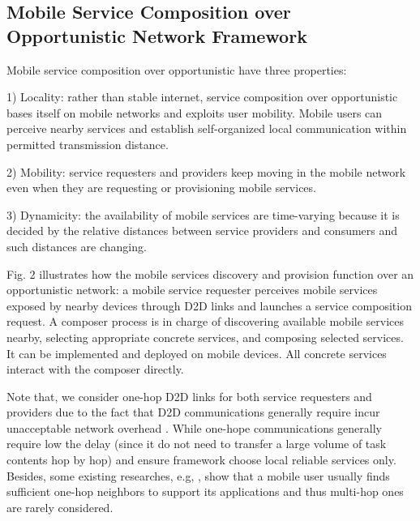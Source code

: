 \documentclass[journal]{IEEEtran}
\begin{document}
\subsection{Mobile Service Composition over Opportunistic Network Framework}

Mobile service composition over opportunistic have three properties:

1) Locality: rather than stable internet, service composition over opportunistic bases itself on mobile networks and exploits user mobility. Mobile users can perceive nearby services and establish self-organized local communication within permitted transmission distance.

2) Mobility: service requesters and providers keep moving in the mobile network even when they are requesting or provisioning mobile services.

3) Dynamicity: the availability of mobile services are time-varying because it is decided by the relative distances between service providers and consumers and such distances are changing.

Fig. 2 illustrates how the mobile services discovery and provision function over an opportunistic network: a mobile service requester perceives mobile services exposed by nearby devices through D2D links and launches a service composition request. A composer process is in charge of discovering available mobile services nearby, selecting appropriate concrete services, and composing selected services. It can be implemented and deployed on mobile devices. All concrete services interact with the composer directly.

Note that, we consider one-hop D2D links for both service requesters and providers due to the fact that D2D communications generally require incur unacceptable network overhead \cite{li2014can}. While one-hope communications generally require low the delay (since it do not need to transfer a large volume of task contents hop by hop) and ensure framework choose local reliable services only.
Besides, some existing researches, e.g, \cite{chang2015progressive, tuncay2013participant, wu2013homing, jiang2016exploiting, liu2013exploring}, show that a mobile user usually finds sufficient one-hop neighbors to support its applications and thus multi-hop ones are rarely considered.

\end{document}
